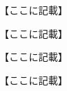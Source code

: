 \documentclass{ltjsarticle}
\begin{document}
\maketitle















\SecB{}

【ここに記載】

\SecB{}

【ここに記載】



\SecB{}

【ここに記載】

\SecB{}

【ここに記載】





\Ijo[2\zw]
\end{document}
